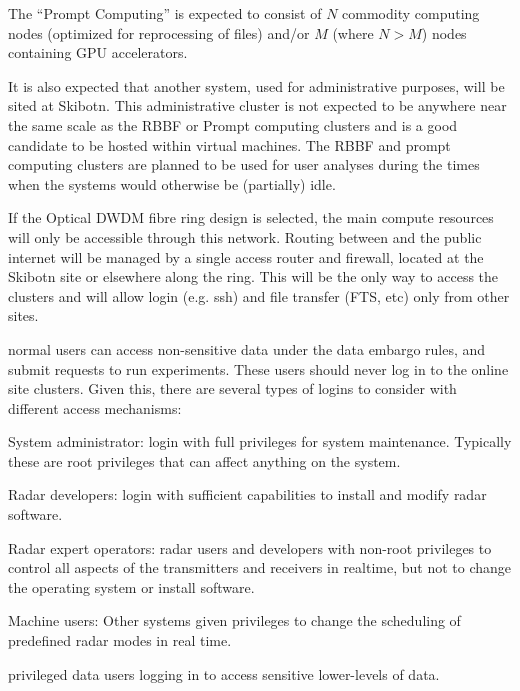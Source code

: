 \documentclass[12pt,a4paper]{article}
\begin{document}
The ``Prompt Computing'' is expected to consist of $N$ commodity computing nodes (optimized for reprocessing of files) and/or $M$ (where $N > M$) nodes containing GPU accelerators.

It is also expected that another system, used for administrative purposes, will be sited at Skibotn. This administrative cluster is not expected to be anywhere near the same scale as the RBBF or Prompt computing clusters
and is a good candidate to be hosted within virtual machines.
The RBBF and prompt computing clusters are planned to be used for \ED user analyses during the times when the systems would otherwise be (partially) idle.

If the Optical DWDM fibre ring design is selected, the main \ED compute resources will only be accessible through this network. Routing between \ED and the public internet will be managed by a single access router and firewall, located at the Skibotn site or elsewhere along the ring.
This will be the only way to access the clusters and will allow login (e.g. ssh) and file transfer (FTS, etc) only from other \EC sites. 

\EC normal users can access non-sensitive data under the \EC data embargo rules, and submit requests to run experiments. 
These users should never log in to the online site clusters.
Given this, there are several types of logins to consider with different access mechanisms:
\bitm
\item System administrator: login with full privileges for system maintenance. Typically these are root privileges that can affect anything on the system.

\item Radar developers: login with sufficient capabilities to install and modify radar software.

\item Radar expert operators: radar users and developers with non-root privileges to control all aspects of the transmitters and receivers in realtime, but not to change the operating system or install software.

\item Machine users: Other systems given privileges to change the scheduling of predefined radar modes in real time. 

\item \EC privileged data users logging in to access sensitive lower-levels of data.
\end{document}
